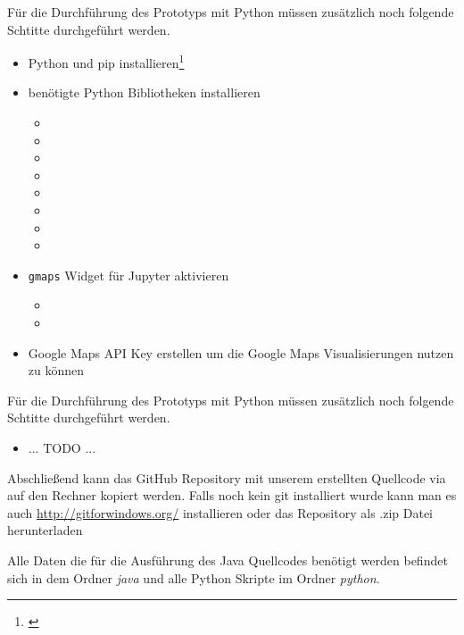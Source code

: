 Für die Durchführung des Prototyps mit Python müssen zusätzlich noch folgende Schtitte durchgeführt werden.
\begin{itemize}
  \item Python und pip installieren\footnote{\cite{Python}}
  \item benötigte Python Bibliotheken installieren
  \begin{itemize}
    \item {}
    \item {}
    \item {}
    \item {}
    \item {}
    \item {}
    \item {}
    \item {}
  \end{itemize}
  \item \texttt{gmaps} Widget für Jupyter aktivieren
  \begin{itemize}
    \item {}
    \item {}
  \end{itemize}
  \item Google Maps API Key erstellen um die Google Maps Visualisierungen nutzen zu können
\end{itemize}

Für die Durchführung des Prototyps mit Python müssen zusätzlich noch folgende Schtitte durchgeführt werden.
\begin{itemize}
  \item ... TODO ...
\end{itemize}

Abschließend kann das GitHub Repository mit unserem erstellten Quellcode via 
auf den Rechner kopiert werden.
Falls noch kein git installiert wurde kann man es auch \hyperref[hier]{http://gitforwindows.org/} installieren oder das Repository als .zip Datei herunterladen

Alle Daten die für die Ausführung des Java Quellcodes benötigt werden befindet sich in dem Ordner \textit{java}
und alle Python Skripte im Ordner \textit{python}.

